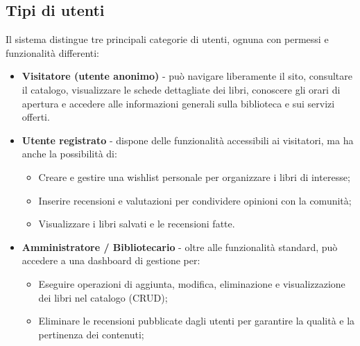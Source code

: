 \documentclass{article}
\begin{document}
\subsection{Tipi di utenti}
Il sistema distingue tre principali categorie di utenti, ognuna con permessi e funzionalità differenti:
\begin{itemize}
    \item \textbf{Visitatore (utente anonimo)} - può navigare liberamente il sito, consultare il catalogo, visualizzare le schede dettagliate dei libri, conoscere gli orari di apertura e accedere alle informazioni generali sulla biblioteca e sui servizi offerti.  
    \item \textbf{Utente registrato} - dispone delle funzionalità accessibili ai visitatori, ma ha anche la possibilità di:
          \begin{itemize}
              \item Creare e gestire una wishlist personale per organizzare i libri di interesse;
              \item Inserire recensioni e valutazioni per condividere opinioni con la comunità;
              \item Visualizzare i libri salvati e le recensioni fatte.
          \end{itemize}
    \item \textbf{Amministratore / Bibliotecario} - oltre alle funzionalità standard, può accedere a una dashboard di gestione per:
          \begin{itemize}
              \item Eseguire operazioni di aggiunta, modifica, eliminazione e visualizzazione dei libri nel catalogo (CRUD);
              \item Eliminare le recensioni pubblicate dagli utenti per garantire la qualità e la pertinenza dei contenuti;
          \end{itemize}
\end{itemize}
\end{document}
